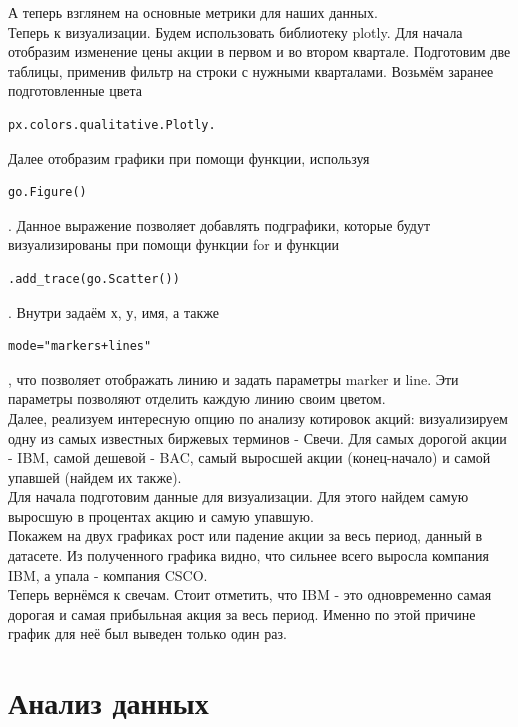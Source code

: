 \documentclass{article}
\begin{document}
А теперь взглянем на основные метрики для наших данных. 
\\
 
Теперь к визуализации. Будем использовать библиотеку plotly. Для начала отобразим изменение цены акции в первом и во втором квартале. Подготовим две таблицы, применив фильтр на строки с нужными кварталами. Возьмём заранее подготовленные цвета 
\begin{lstlisting}
px.colors.qualitative.Plotly.
\end{lstlisting}
Далее отобразим графики при помощи функции, используя \begin{lstlisting}
go.Figure()
\end{lstlisting}. Данное выражение позволяет добавлять подграфики, которые будут визуализированы при помощи функции for и функции \begin{lstlisting}
.add_trace(go.Scatter())
\end{lstlisting}. Внутри задаём х, у, имя, а также \begin{lstlisting}
mode="markers+lines"
\end{lstlisting}, что позволяет отображать линию и задать параметры marker и line. Эти параметры позволяют отделить каждую линию своим цветом.  
 \\
 
Далее, реализуем интересную опцию по анализу котировок акций: визуализируем одну из самых известных биржевых терминов - Свечи. Для самых дорогой акции - IBM, самой дешевой - BAC, самый выросшей акции (конец-начало) и самой упавшей (найдем их также). 
\\
 
Для начала подготовим данные для визуализации. Для этого найдем самую выросшую в процентах акцию и самую упавшую.
\\
 
Покажем на двух графиках рост или падение акции за весь период, данный в датасете. Из полученного графика видно, что сильнее всего выросла компания IBM, а упала - компания CSCO.  
\\
 
Теперь вернёмся к свечам. Стоит отметить, что IBM - это одновременно самая дорогая и самая прибыльная акция за весь период. Именно по этой причине график для неё был выведен только один раз. 
\\

\section{Анализ данных}
\end{document}
